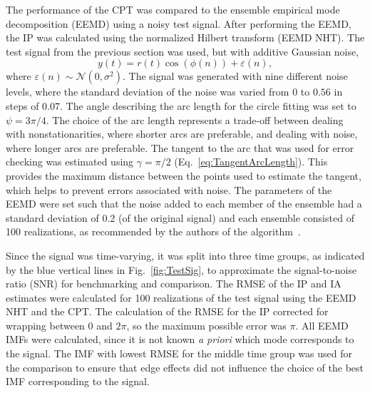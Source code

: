 \documentclass[11pt,draftcls,onecolumn]{IEEEtran}
\begin{document}
The performance of the CPT was compared to the ensemble empirical mode decomposition (EEMD) using a noisy test signal. After performing the EEMD, the IP was calculated using the normalized Hilbert transform (EEMD NHT). The test signal from the previous section was used, but with additive Gaussian noise,
\begin{equation}
    y(t)=r\left(t\right)\cos\left(\phi\left(n\right)\right) + \varepsilon \left( n \right),
\end{equation}
where $\varepsilon(n) \sim \mathcal{N}(0,\sigma^2)$. The signal was generated with nine different noise levels, where the standard deviation of the noise was varied from $0$ to $0.56$ in steps of $0.07$. The angle describing the arc length for the circle fitting was set to $\psi=3\pi/4$. The choice of the arc length represents a trade-off between dealing with nonstationarities, where shorter arcs are preferable, and dealing with noise, where longer arcs are preferable. The tangent to the arc that was used for error checking was estimated using $\gamma = \pi/2$ (Eq.~\ref{eq:TangentArcLength}). This provides the maximum distance between the points used to estimate the tangent, which helps to prevent errors associated with noise. The parameters of the EEMD were set such that the noise added to each member of the ensemble had a standard deviation of 0.2 (of the original signal) and each ensemble consisted of 100 realizations, as recommended by the authors of the algorithm~\cite{Wu2009}. 

Since the signal was time-varying, it was split into three time groups, as indicated by the blue vertical lines in Fig.~\ref{fig:TestSig}, to approximate the signal-to-noise ratio (SNR) for benchmarking and comparison. The RMSE of the IP and IA estimates were calculated for 100 realizations of the test signal using the EEMD NHT and the CPT. The calculation of the RMSE for the IP corrected for wrapping between $0$ and $2\pi$, so the maximum possible error was $\pi$. All EEMD IMFs were calculated, since it is not known \emph{a priori} which mode corresponds to the signal. The IMF with lowest RMSE for the middle time group was used for the comparison to ensure that edge effects did not influence the choice of the best IMF corresponding to the signal. 
\end{document}
